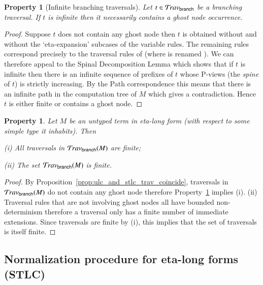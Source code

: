 \documentclass{elsarticle}
\theoremstyle{plain}
\newtheorem{property}[theorem]{Property}
\theoremstyle{definition}
\theoremstyle{remark}
\newcommand{\ghostvar}{\theta}
\newcommand{\branching}{{\sf branch}}
\newcommand{\travsetbr}{{\travset_\branching}}
\begin{document}
\begin{property}[Infinite branching traversals]
\label{prop:branching_spine_property}
Let $t\in \travsetbr$ be a branching traversal. If $t$ is infinite then it necessarily contains a ghost node occurrence.
\end{property}
\begin{proof}
Suppose $t$ does not contain any ghost node then
$t$ is obtained without \rulenamet{Lam^\ghostvar_\branching} and without the `eta-expansion' subcases of the variable rules. The remaining rules correspond precisely to the traversal rules of
\cite{OngLics2006} (where  is renamed ).
We can therefore appeal to the Spinal Decomposition Lemma
\cite[Lemma 8]{OngLics2006} which shows that if $t$ is infinite then there is an infinite sequence of prefixes of $t$ whose P-views (the \emph{spine} of $t$) is strictly increasing. By the Path correspondence this means that there is an infinite path in the computation tree of $M$ which gives a contradiction. Hence $t$ is either finite or contains a ghost node.
\end{proof}

\begin{property}
\label{prop:etalong_trav_finite}
Let $M$ be an untyped term in eta-long form (with respect to some simple type it inhabits). Then
\begin{enumerate*}
\item[(i)] All traversals in $\travsetbr(M)$ are finite;
\item[(ii)] The set $\travsetbr(M)$ is finite.
\end{enumerate*}
\end{property}
\begin{proof}
By Proposition~\ref{prop:ulc_and_stlc_trav_coincide}, traversals in $\travsetbr(M)$ do not contain any ghost node therefore Property~\ref{prop:branching_spine_property} implies (i).
(ii) Traversal rules that are not involving ghost nodes all have bounded non-determinism therefore a traversal only has a finite number of immediate extensions. Since traversals are finite by (i), this implies that the set of traversals is itself finite.
\end{proof}


\subsection{Normalization procedure for eta-long forms (STLC)}
\end{document}

